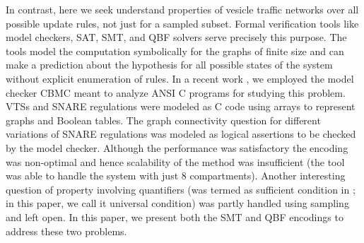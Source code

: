 %
%
%
%
%
%
%
%

In contrast, here we seek understand properties of vesicle traffic networks over all possible update rules, not just for a sampled subset.
%
Formal verification tools like model checkers, SAT,  SMT, and QBF solvers serve precisely this purpose. 
%
The tools model the computation symbolically for the graphs of finite size and can make a prediction about the hypothesis for all possible states of the system without explicit enumeration of rules. 
%
In a recent work \cite{shukla2017discovering}, we employed the model checker CBMC \cite{ckl2004} meant to analyze ANSI C programs for studying this problem. 
%
VTSs and SNARE regulations were modeled as C code using arrays to represent graphs and Boolean tables. 
%
The graph connectivity question for different variations of SNARE regulations was modeled as logical assertions to be checked by the model checker. 
%
Although the performance was satisfactory the encoding was non-optimal and hence scalability of the method was insufficient (the tool was able to handle the system with just 8 compartments).
%
Another interesting question of property involving quantifiers (was termed as sufficient condition in \cite{shukla2017discovering}; in this paper, we call it universal condition) was partly handled using sampling and left open.
%
In this paper, we present both the SMT and QBF encodings to address these two problems.
%
%


